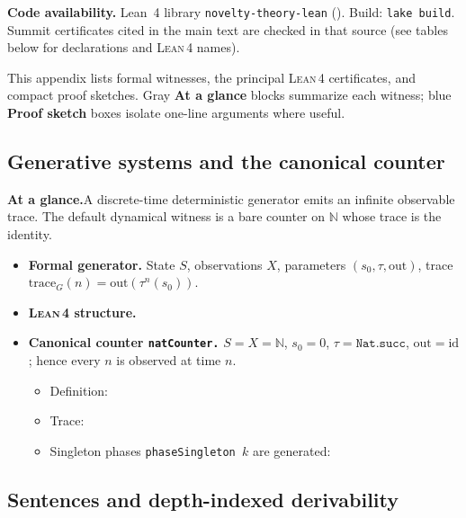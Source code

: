 \documentclass[11pt,a4paper]{article}
\newenvironment{witnessmeta}{%
  \par\smallskip
  \begin{tcolorbox}[
    enhanced, breakable=false,
    colback=gray!7, colframe=gray!55, boxrule=0.45pt, arc=2pt,
    left=8pt, right=8pt, top=5pt, bottom=5pt,
    before skip=0.25\baselineskip, after skip=0.4\baselineskip,
    fontupper=\small
  ]
}{\end{tcolorbox}}
\theoremstyle{definition}
\newcommand{\lean}{\textsc{Lean}\,4}
\begin{document}
\medskip
\noindent\textbf{Code availability.} Lean~4 library \texttt{novelty-theory-lean} (). Build: \texttt{lake build}. Summit certificates cited in the main text are checked in that source (see tables below for declarations and \lean{} names).

\medskip
This appendix lists formal witnesses, the principal \lean{} certificates, and compact proof sketches. Gray \textbf{At a glance} blocks summarize each witness; blue \textbf{Proof sketch} boxes isolate one-line arguments where useful.

\subsection{Generative systems and the canonical counter}

\begin{witnessmeta}
\textbf{At a glance.}\quad A discrete-time deterministic generator emits an infinite observable trace. The default dynamical witness is a bare counter on $\mathbb{N}$ whose trace is the identity.
\end{witnessmeta}

\begin{itemize}[leftmargin=1.6em, itemsep=0.35em]
\item \textbf{Formal generator.} State $S$, observations $X$, parameters $(s_0,\tau,\mathrm{out})$, trace $\mathrm{trace}_G(n)=\mathrm{out}(\tau^n(s_0))$.
\item \textbf{\lean{} structure.} 
\item \textbf{Canonical counter \texttt{natCounter.}} $S=X=\mathbb{N}$, $s_0=0$, $\tau=\texttt{Nat.succ}$, $\mathrm{out}=\mathrm{id}$; hence every $n$ is observed at time $n$.
  \begin{itemize}[leftmargin=1.2em, nosep, topsep=2pt]
  \item Definition: 
  \item Trace: 
  \item Singleton phases \texttt{phaseSingleton $k$} are generated: 
  \end{itemize}
\end{itemize}

\subsection{Sentences and depth-indexed derivability}
\end{document}

